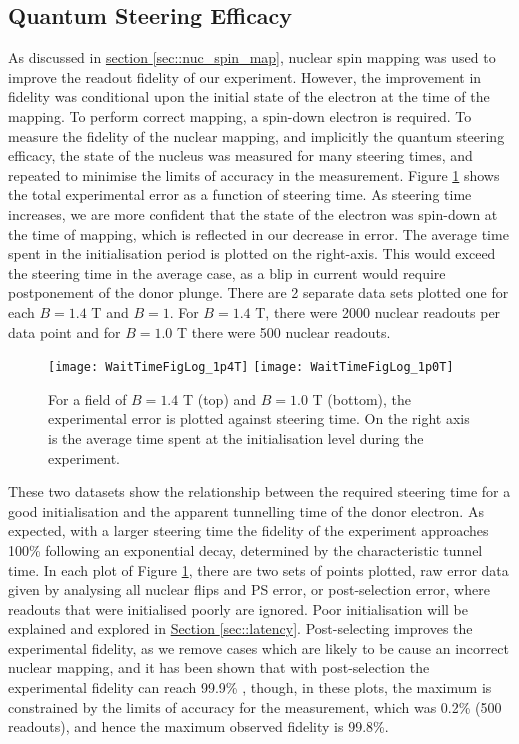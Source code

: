 \label{sec::results}
\subsection{Quantum Steering Efficacy}
	\label{sec::steering}

	As discussed in \hyperref[sec::nuc_spin_map]{section \ref{sec::nuc_spin_map}}, nuclear spin mapping was used to improve the readout fidelity of our experiment. However, the improvement in fidelity was conditional upon the initial state of the electron at the time of the mapping. To perform correct mapping, a spin-down electron is required. To measure the fidelity of the nuclear mapping, and implicitly the quantum steering efficacy, the state of the nucleus was measured for many steering times, and repeated to minimise the limits of accuracy in the measurement. Figure \ref{fig::wait_time} shows the total experimental error as a function of steering time. As steering time increases, we are more confident that the state of the electron was spin-down at the time of mapping, which is reflected in our decrease in error. The average time spent in the initialisation period is plotted on the right-axis. This would exceed the steering time in the average case, as a blip in current would require postponement of the donor plunge.	There are 2 separate data sets plotted one for each $B = 1.4$ T and $B = 1$. For $B = 1.4$ T, there were 2000 nuclear readouts per data point and for $B = 1.0$ T there were 500 nuclear readouts.
	
	\begin{figure}[htbp!]
		\centering
		\vspace{-1cm}
		\texttt{[image: WaitTimeFigLog\_1p4T]}
		\texttt{[image: WaitTimeFigLog\_1p0T]}
		\caption{For a field of $B = 1.4$ T (top) and $B = 1.0$ T (bottom), the experimental error is plotted against steering time. On  the right axis is the average time spent at the initialisation level during the experiment.}
		\label{fig::wait_time}
	\end{figure}
		
	These two datasets show the relationship between the required steering time for a good initialisation and the apparent tunnelling time of the donor electron. As expected, with a larger steering time the fidelity of the experiment approaches 100\% following an exponential decay, determined by the characteristic tunnel time. In each plot of Figure \ref{fig::wait_time}, there are two sets of points plotted, raw error data given by analysing all nuclear flips and PS error, or post-selection error, where readouts that were initialised poorly are ignored. Poor initialisation will be explained and explored in \hyperref[sec::latency]{Section \ref{sec::latency}}. Post-selecting improves the experimental fidelity, as we remove cases which are likely to be cause an incorrect nuclear mapping, and it has been shown that with post-selection the experimental fidelity can reach 99.9\% , though, in these plots, the maximum is constrained by the limits of accuracy for the measurement, which was 0.2\% (500 readouts), and hence the maximum observed fidelity is 99.8\%.

